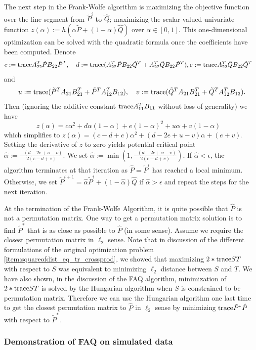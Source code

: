 \documentclass[12pt,oneside,final]{thesis}\usepackage[]{graphicx}\usepackage[]{color}
\begin{document}
The next step in the Frank-Wolfe algorithm 
is maximizing the objective function over the line
segment from $\tilde{P}^{i}$ to $\hat{Q}$;  \ie maximizing the scalar-valued univariate function $z(\alpha):=h(\alpha \tilde{P}
+(1-\alpha ) \hat{Q})$ over $\alpha \in [0,1]$. This one-dimensional optimization can be solved with the quadratic formula once the coefficients have been computed. Denote
$$c:=\tr A^T_{22} \tilde{P} B_{22} \tilde{P}^T,\quad d:=\tr (A^T_{22} \tilde{P} B_{22} \tilde{Q}^T +
    A^T_{22} \tilde{Q} B_{22} \tilde{P}^T), \onespace e:=\tr A^T_{22} \tilde{Q} B_{22} \tilde{Q}^T$$ and
$$\quad u:=\textup{trace} ( \tilde{P}^TA_{21}B_{21}^T   + \tilde{P}^TA_{12}^TB_{12} ), \quad v:=\textup{trace} ( \tilde{Q}^TA_{21}B_{21}^T   + \tilde{Q}^TA_{12}^TB_{12} ).$$ Then
(ignoring the additive constant $\textup{trace} A_{11}^TB_{11}$ without loss of
generality)
we have $$z(\alpha)=c \alpha^2+d \alpha (1-\alpha)
+e(1-\alpha)^2+u \alpha + v(1-\alpha)$$  which simplifies to
$z(\alpha)=(c-d+e)\alpha^2+(d-2e+u-v)\alpha + (e+v)$. Setting the
derivative of $z$ to zero yields potential critical point
$\hat{\alpha}:=\frac{-(d-2e+u-v)}{2(c-d+e)}$. We set $\hat{\alpha}:=\min(1,\frac{-(d-2e+u-v)}{2(c-d+e)})$.
If $\hat{\alpha}<\epsilon$, the algorithm terminates at that iteration as  $\hat{P}=\tilde{P}^{i}$  has reached a local minimum. Otherwise, we set $\tilde{P}^{i+1}= \hat{\alpha} \tilde{P}^{i}
+(1- \hat{\alpha} ) \hat{Q}$ if $\hat{\alpha}>\epsilon$   and repeat the steps for the next iteration.

At the termination of the Frank-Wolfe Algorithm, it is quite possible that   $\hat{P}$ is not a permutation matrix. One way to get a permutation matrix solution is to find  ${\tilde{P}}^{*}$ that is as close as possible to  $\hat{P}$ (in some sense). Assume we require the closest permutation matrix in $\ell_2$ sense. Note that in discussion of the different formulations of the  original optimization problem \ref{item:squareofdist_eq_tr_crossprod}, we showed that maximizing $2*\textup{trace} {ST}$ with respect to $S$ was equivalent to minimizing $\ell_2$ distance between $S$ and $T$. We have also shown, in the discussion of the FAQ algorithm, minimization of  $2*\textup{trace} {ST}$ is solved by the Hungarian algorithm when $S$ is constrained to be permutation matrix. Therefore we can use the Hungarian algorithm one last time to get  the closest permutation matrix to  $\hat{P}$ in $\ell_2$ sense by minimizing $\textup{trace} {\tilde{P}}^{*}\hat{P}$ with respect to ${\tilde{P}}^{*}$.

\subsubsection{Demonstration of FAQ on simulated data\label{subsubsec:sgm_sim_results}}
\end{document}
